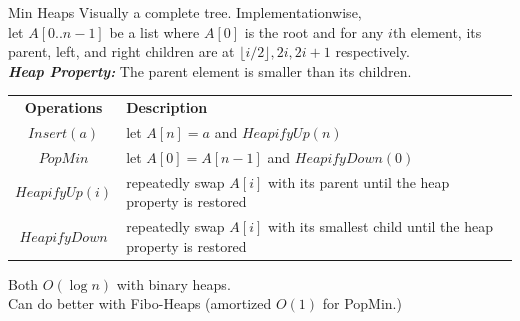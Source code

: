 \documentclass[10pt,a4paper]{article}
\begin{document}
\begin{multicols}{3}
\begin{textbox}{Min Heaps}
     Visually a complete tree. Implementationwise,\\
    let $A[0..n-1]$ be a list where $A[0]$ is the root and for any $i$th element, its parent, left, and right children are at $\lfloor i/2 \rfloor, 2i, 2i+1$ respectively.\\
    \linebreak
    {\bf \emph{Heap Property:}} The parent element is smaller than its children.\\
    \linebreak
    \begin{tabular}{c |p{}}\scriptsize
        {\bf Operations} & {\bf Description} \\
        $Insert(a)$ & let $A[n] = a$ and $HeapifyUp(n)$ \\
        $PopMin$ & let $A[0] = A[n-1]$ and $HeapifyDown(0)$ \\
        $HeapifyUp(i)$ & repeatedly swap $A[i]$ with its parent until the heap property is restored \\
        $HeapifyDown$ & repeatedly swap $A[i]$ with its smallest child until the heap property is restored \\
    \end{tabular}
     Both $O(\log n)$ with binary heaps. \\
     Can do better with Fibo-Heaps (amortized $O(1)$ for PopMin.)\\
\end{textbox}





\end{multicols}
\end{document}
